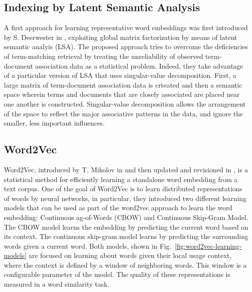 \subsection{Indexing by Latent Semantic Analysis}

A first approach for learning representative word embeddings was first
introduced by S. Deerwester \etal{} in \cite{deerwester1990indexing},
exploiting global matrix factorization by means of latent semantic
analyis (LSA). The proposed approach tries to overcome the
deficiencies of term-matching retrieval by treating the unreliability
of observed term-document association data as a statistical problem.
Indeed, they take advantage of a particular version of LSA that uses
singular-value decomposition. First, a large matrix of term-document
association data is crteated and then a semantic space wherein terms
and documents that are closely associated are placed near one another
is constructed. Singular-value decomposition allows the arrangement of
the space to reflect the major associative patterns in the data, and
ignore the smaller, less important influences.

\subsection{Word2Vec}

Word2Vec, introduced by T. Mikolov in \cite{mikolov2013efficient} and
then updated and revisioned in \cite{mikolov2013distributed,
mikolov2013linguistic}, is a statistical method for efficiently
learning a standalone word embedding from a text corpus. One of the
goal of Word2Vec is to learn distributed representations of words by
neural networks, in particular, they introduced two different learning
models that can be used as part of the word2vec approach to learn the
word embedding: Continuous ag-of-Words (CBOW) and Continuous Skip-Gram
Model. The CBOW model learns the embedding by predicting the current
word based on its context. The continuous skip-gram model learns by
predicting the surrounding words given a current word. Both models,
shown in Fig.~\ref{fig:word2vec-learning-models} are focused on
learning about words given their local usage context, where the
context is defined by a window of neighboring words. This window is a
configurable parameter of the model. The quality of these
representations is measured in a
word similarity task.

